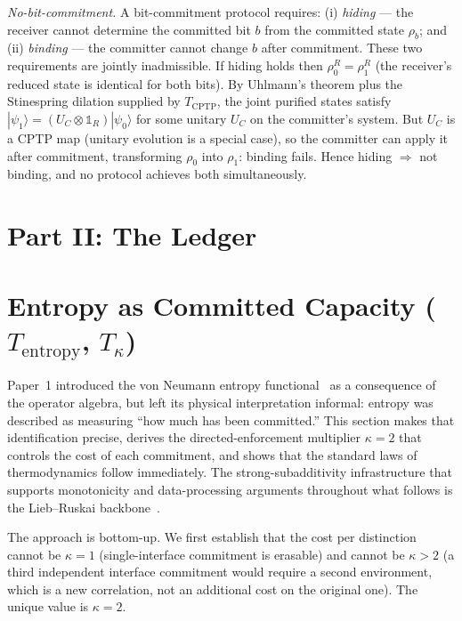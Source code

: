 \documentclass[11pt]{article}
\begin{document}
\smallskip\noindent\emph{No-bit-commitment.}  A bit-commitment protocol
requires: (i) \emph{hiding} --- the receiver cannot determine the committed
bit $b$ from the committed state $\rho_b$; and (ii) \emph{binding} --- the
committer cannot change $b$ after commitment.  These two requirements are
jointly inadmissible.  If hiding holds then $\rho_0^R = \rho_1^R$ (the
receiver's reduced state is identical for both bits).  By Uhlmann's theorem
plus the Stinespring dilation supplied by $T_{\mathrm{CPTP}}$, the joint
purified states satisfy $|\psi_1\rangle = (U_C\otimes\mathbb{1}_R)|\psi_0\rangle$
for some unitary $U_C$ on the committer's system.  But $U_C$ is a CPTP map
(unitary evolution is a special case), so the committer can apply it after
commitment, transforming $\rho_0$ into $\rho_1$: binding fails.  Hence hiding
$\Rightarrow$ not binding, and no protocol achieves both simultaneously.


\section{Part II: The Ledger}

\setcounter{subsection}{0}

\section{Entropy as Committed Capacity ($T_{\mathrm{entropy}}$, $T_{\kappa}$)}
\label{sec:entropy}

Paper~1 introduced the von Neumann entropy functional~\cite{vonNeumann1932}
as a consequence of the operator algebra, but left its physical interpretation
informal: entropy was described as measuring ``how much has been committed.''
This section makes that identification precise, derives the directed-enforcement
multiplier $\kappa = 2$ that controls the cost of each commitment, and shows that
the standard laws of thermodynamics follow immediately.  The strong-subadditivity
infrastructure that supports monotonicity and data-processing arguments throughout
what follows is the Lieb--Ruskai backbone~\cite{LiebRuskai1973,Wehrl1978}.

The approach is bottom-up.  We first establish that the cost per
distinction cannot be $\kappa = 1$ (single-interface commitment is erasable)
and cannot be $\kappa > 2$ (a third independent interface commitment would
require a second environment, which is a new correlation, not an additional
cost on the original one).  The unique value is $\kappa = 2$.
\end{document}
